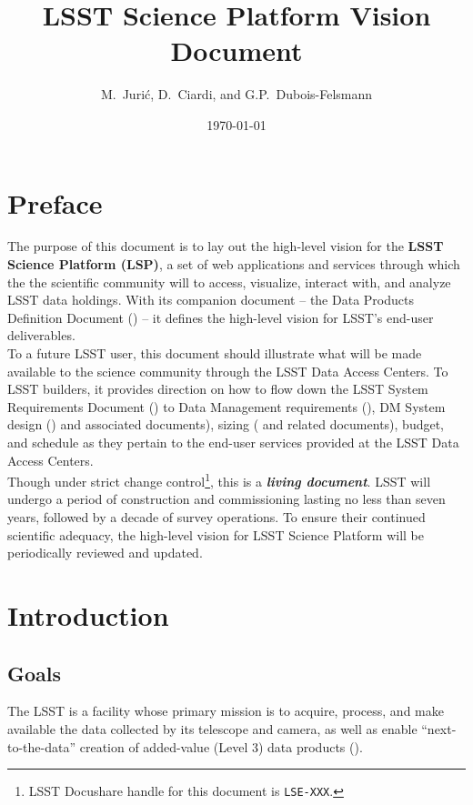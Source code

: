 \documentclass[DM,lsstdraft,toc]{lsstdoc}
\title[LSST Science Platform]{LSST Science Platform Vision Document}
\author{
M.~Juri\'c,
D.~Ciardi,
and
G.P.~Dubois-Felsmann
}
\date{\today}
\begin{document}
\maketitle

\section{Preface}

The purpose of this document is to lay out the high-level vision for the {\bf LSST Science Platform (LSP)}, a set of web applications and services through which the the scientific community will to access, visualize, interact with, and analyze LSST data holdings. With its companion document -- the Data Products Definition Document (\DPDD) -- it defines the high-level vision for LSST's end-user deliverables.
\\

To a future LSST user, this document should illustrate what will be made available to the science community through the LSST Data Access Centers. To LSST builders, it provides direction on how to flow down the LSST System Requirements Document (\LSR) to Data Management requirements (\DMSR), DM System design () and associated documents), sizing ( and related documents), budget, and schedule as they pertain to the end-user services provided at the LSST Data Access Centers.
\\

Though under strict change control\footnote{LSST Docushare handle for this document is {\tt LSE-XXX}.}, this is a {\bf \em living document}. LSST will undergo a period of construction  and commissioning lasting no less than seven years, followed by a decade of survey operations. To ensure their continued scientific adequacy, the high-level vision for LSST Science Platform will be periodically reviewed and updated.

\clearpage

\section{Introduction}

\subsection{Goals}

The LSST is a facility whose primary mission is to acquire, process, and
make available the data collected by its telescope and camera, as well as
enable ``next-to-the-data'' creation of added-value (Level 3) data products
(\SRD).
\end{document}
